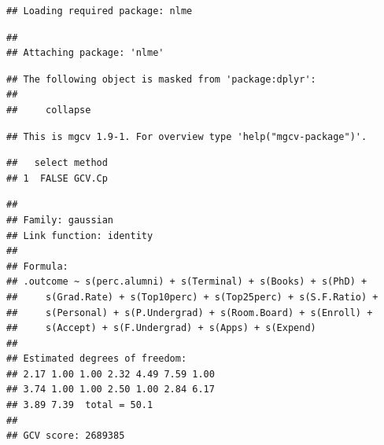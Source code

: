 \documentclass[
]{article}
\newenvironment{Shaded}{\begin{snugshade}}{\end{snugshade}}
\newcommand{\CommentTok}[1]{\textcolor[rgb]{0.56,0.35,0.01}{\textit{#1}}}
\newcommand{\FunctionTok}[1]{\textcolor[rgb]{0.13,0.29,0.53}{\textbf{#1}}}
\newcommand{\NormalTok}[1]{#1}
\newcommand{\SpecialCharTok}[1]{\textcolor[rgb]{0.81,0.36,0.00}{\textbf{#1}}}
\begin{document}
\begin{verbatim}
## Loading required package: nlme
\end{verbatim}

\begin{verbatim}
## 
## Attaching package: 'nlme'
\end{verbatim}

\begin{verbatim}
## The following object is masked from 'package:dplyr':
## 
##     collapse
\end{verbatim}

\begin{verbatim}
## This is mgcv 1.9-1. For overview type 'help("mgcv-package")'.
\end{verbatim}

\begin{Shaded}
\end{Shaded}

\begin{verbatim}
##   select method
## 1  FALSE GCV.Cp
\end{verbatim}

\begin{Shaded}
\end{Shaded}

\begin{verbatim}
## 
## Family: gaussian 
## Link function: identity 
## 
## Formula:
## .outcome ~ s(perc.alumni) + s(Terminal) + s(Books) + s(PhD) + 
##     s(Grad.Rate) + s(Top10perc) + s(Top25perc) + s(S.F.Ratio) + 
##     s(Personal) + s(P.Undergrad) + s(Room.Board) + s(Enroll) + 
##     s(Accept) + s(F.Undergrad) + s(Apps) + s(Expend)
## 
## Estimated degrees of freedom:
## 2.17 1.00 1.00 2.32 4.49 7.59 1.00 
## 3.74 1.00 1.00 2.50 1.00 2.84 6.17 
## 3.89 7.39  total = 50.1 
## 
## GCV score: 2689385
\end{verbatim}

\begin{Shaded}
\end{Shaded}
\end{document}
